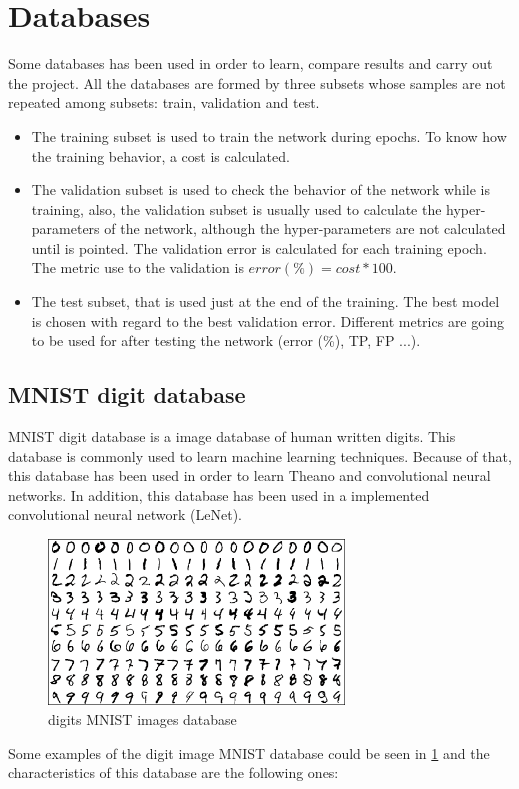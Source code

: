 \section{Databases}
Some databases has been used in order to learn, compare results and carry out the project. All the databases are formed by three subsets whose samples are not repeated among subsets: train, validation and test. 

\begin{itemize}
\item The training subset is used to train the network during epochs. To know how the training behavior, a cost is calculated.
\item The validation subset is used to check the behavior of the network while is training, also, the validation subset is usually used to calculate the hyper-parameters of the network, although the hyper-parameters are not calculated until is pointed. The validation error is calculated for each training epoch. The metric use to the validation is $error(\%) = cost*100$.
\item  The test subset, that is used just at the end of the training. The best model is chosen with regard to the best validation error. Different metrics are going to be used for after testing the network (error (\%), TP, FP ...).
\end{itemize}

\subsection{MNIST digit database}
MNIST digit database is a image database of human written digits. This database is commonly used to learn machine learning techniques. Because of that, this database has been used in order to learn Theano and convolutional neural networks. In addition, this database has been used in a implemented convolutional neural network (LeNet).\\
\begin{figure}[htb]
\centering
\includegraphics[width=0.7\textwidth]{images_databases/mnistExamples.png}
\caption{digits MNIST images database} \label{fig:MNIST_digits}
\end{figure}
Some examples of the digit image MNIST database could be seen in \ref{fig:MNIST_digits} and the characteristics of this database are the following ones:

